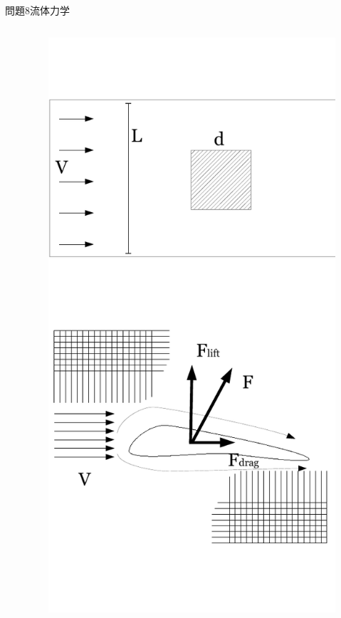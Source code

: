 \documentclass[dvipdfmx]{beamer}
\begin{document}
\begin{frame}{問題8}{流体力学}
\begin{columns}[t]
\begin{column}{0.7\textwidth}
\end{column}
\begin{column}{0.3\textwidth}
\begin{figure}[htbp]
    \centering
    \includegraphics[bb=0mm 0mm 100.0mm 170.0mm, scale=0.35, type=pdf]{img/problem8.pdf}
\end{figure}
\end{column}
\end{columns}
\end{frame}
\end{document}
